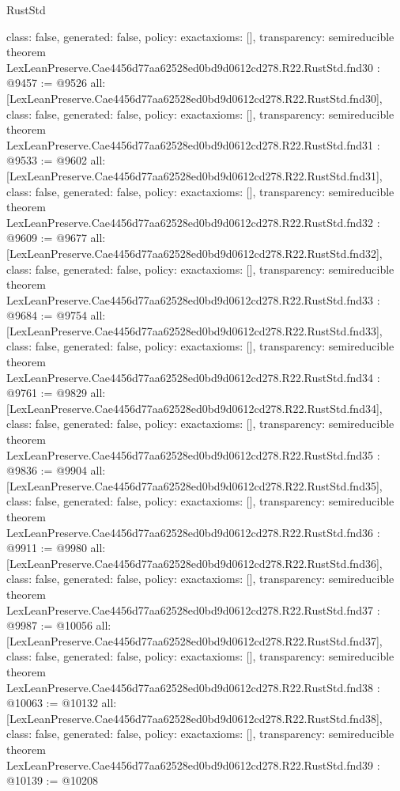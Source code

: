 \begin{lexlean}{RustStd}
\begin{coremodule}
{  class: false,
  generated: false,
  policy: exact{axioms: []},
  transparency: semireducible
}
theorem LexLeanPreserve.Cae4456d77aa62528ed0bd9d0612cd278.R22.RustStd.fnd30 : @9457 := @9526 {
  all: [LexLeanPreserve.Cae4456d77aa62528ed0bd9d0612cd278.R22.RustStd.fnd30],
  class: false,
  generated: false,
  policy: exact{axioms: []},
  transparency: semireducible
}
theorem LexLeanPreserve.Cae4456d77aa62528ed0bd9d0612cd278.R22.RustStd.fnd31 : @9533 := @9602 {
  all: [LexLeanPreserve.Cae4456d77aa62528ed0bd9d0612cd278.R22.RustStd.fnd31],
  class: false,
  generated: false,
  policy: exact{axioms: []},
  transparency: semireducible
}
theorem LexLeanPreserve.Cae4456d77aa62528ed0bd9d0612cd278.R22.RustStd.fnd32 : @9609 := @9677 {
  all: [LexLeanPreserve.Cae4456d77aa62528ed0bd9d0612cd278.R22.RustStd.fnd32],
  class: false,
  generated: false,
  policy: exact{axioms: []},
  transparency: semireducible
}
theorem LexLeanPreserve.Cae4456d77aa62528ed0bd9d0612cd278.R22.RustStd.fnd33 : @9684 := @9754 {
  all: [LexLeanPreserve.Cae4456d77aa62528ed0bd9d0612cd278.R22.RustStd.fnd33],
  class: false,
  generated: false,
  policy: exact{axioms: []},
  transparency: semireducible
}
theorem LexLeanPreserve.Cae4456d77aa62528ed0bd9d0612cd278.R22.RustStd.fnd34 : @9761 := @9829 {
  all: [LexLeanPreserve.Cae4456d77aa62528ed0bd9d0612cd278.R22.RustStd.fnd34],
  class: false,
  generated: false,
  policy: exact{axioms: []},
  transparency: semireducible
}
theorem LexLeanPreserve.Cae4456d77aa62528ed0bd9d0612cd278.R22.RustStd.fnd35 : @9836 := @9904 {
  all: [LexLeanPreserve.Cae4456d77aa62528ed0bd9d0612cd278.R22.RustStd.fnd35],
  class: false,
  generated: false,
  policy: exact{axioms: []},
  transparency: semireducible
}
theorem LexLeanPreserve.Cae4456d77aa62528ed0bd9d0612cd278.R22.RustStd.fnd36 : @9911 := @9980 {
  all: [LexLeanPreserve.Cae4456d77aa62528ed0bd9d0612cd278.R22.RustStd.fnd36],
  class: false,
  generated: false,
  policy: exact{axioms: []},
  transparency: semireducible
}
theorem LexLeanPreserve.Cae4456d77aa62528ed0bd9d0612cd278.R22.RustStd.fnd37 : @9987 := @10056 {
  all: [LexLeanPreserve.Cae4456d77aa62528ed0bd9d0612cd278.R22.RustStd.fnd37],
  class: false,
  generated: false,
  policy: exact{axioms: []},
  transparency: semireducible
}
theorem LexLeanPreserve.Cae4456d77aa62528ed0bd9d0612cd278.R22.RustStd.fnd38 : @10063 := @10132 {
  all: [LexLeanPreserve.Cae4456d77aa62528ed0bd9d0612cd278.R22.RustStd.fnd38],
  class: false,
  generated: false,
  policy: exact{axioms: []},
  transparency: semireducible
}
theorem LexLeanPreserve.Cae4456d77aa62528ed0bd9d0612cd278.R22.RustStd.fnd39 : @10139 := @10208 {
}
\end{coremodule}
\end{lexlean}
